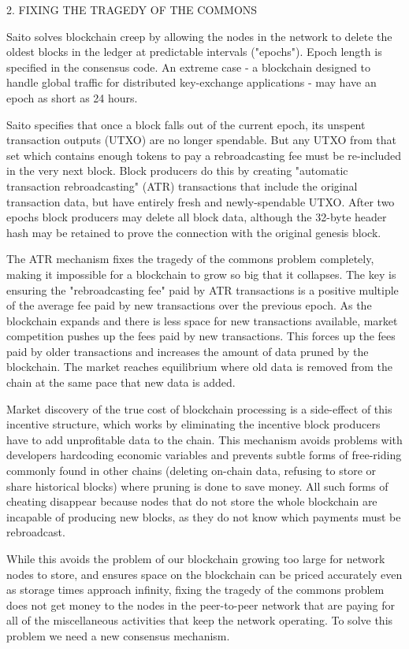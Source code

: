 \documentclass[11pt, oneside]{article}   	%
\begin{document}
\begin{multicols}{2}
2. FIXING THE TRAGEDY OF THE COMMONS

Saito solves blockchain creep by allowing the nodes in the network to delete the oldest blocks in the ledger at predictable intervals ("epochs"). Epoch length is specified in the consensus code. An extreme case - a blockchain designed to handle global traffic for distributed key-exchange applications - may have an epoch as short as 24 hours.

Saito specifies that once a block falls out of the current epoch, its unspent transaction outputs (UTXO) are no longer spendable. But any UTXO from that set which contains enough tokens to pay a rebroadcasting fee must be re-included in the very next block. Block producers do this by creating "automatic transaction rebroadcasting" (ATR) transactions that include the original transaction data, but have entirely fresh and newly-spendable UTXO. After two epochs block producers may delete all block data, although the 32-byte header hash may be retained to prove the connection with the original genesis block.

The ATR mechanism fixes the tragedy of the commons problem completely, making it impossible for a blockchain to grow so big that it collapses. The key is ensuring the "rebroadcasting fee" paid by ATR transactions is a positive multiple of the average fee paid by new transactions over the previous epoch. As the blockchain expands and there is less space for new transactions available, market competition pushes up the fees paid by new transactions. This forces up the fees paid by older transactions and increases the amount of data pruned by the blockchain. The market reaches equilibrium where old data is removed from the chain at the same pace that new data is added. 

Market discovery of the true cost of blockchain processing is a side-effect of this incentive structure, which works by eliminating the incentive block producers have to add unprofitable data to the chain. This mechanism avoids problems with developers hardcoding economic variables and prevents subtle forms of free-riding commonly found in other chains (deleting on-chain data, refusing to store or share historical blocks) where pruning is done to save money. All such forms of cheating disappear because nodes that do not store the whole blockchain are incapable of producing new blocks, as they do not know which payments must be rebroadcast.

While this avoids the problem of our blockchain growing too large for network nodes to store, and ensures space on the blockchain can be priced accurately even as storage times approach infinity, fixing the tragedy of the commons problem does not get money to the nodes in the peer-to-peer network that are paying for all of the miscellaneous activities that keep the network operating. To solve this problem we need a new consensus mechanism.



\end{multicols}
\end{document}
